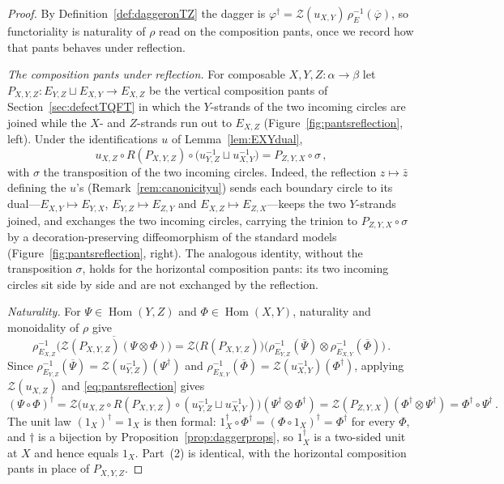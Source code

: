 \documentclass[11pt]{article}
\theoremstyle{definition}
\newcommand{\cZ}{\mathcal{Z}}
\newcommand{\dg}{\dagger}
\begin{document}
\begin{proof}
By Definition~\ref{def:daggeronTZ} the dagger is $\varphi^\dg = \cZ(u_{X,Y})\,\rho_{E}^{-1}(\overline{\varphi})$, so functoriality is naturality of $\rho$ read on the composition pants, once we record how that pants behaves under reflection.

\emph{The composition pants under reflection.} For composable $X, Y, Z \colon \alpha \to \beta$ let $P_{X,Y,Z} \colon E_{Y,Z} \sqcup E_{X,Y} \to E_{X,Z}$ be the vertical composition pants of Section~\ref{sec:defectTQFT} in which the $Y$-strands of the two incoming circles are joined while the $X$- and $Z$-strands run out to $E_{X,Z}$ (Figure~\ref{fig:pantsreflection}, left). Under the identifications $u$ of Lemma~\ref{lem:EXYdual},
\begin{equation}
\label{eq:pantsreflection}
  u_{X,Z} \circ R(P_{X,Y,Z}) \circ \big(u_{Y,Z}^{-1} \sqcup u_{X,Y}^{-1}\big) = P_{Z,Y,X} \circ \sigma \, ,
\end{equation}
with $\sigma$ the transposition of the two incoming circles. Indeed, the reflection $z \mapsto \bar z$ defining the $u$'s (Remark~\ref{rem:canonicityu}) sends each boundary circle to its dual---$E_{X,Y}\mapsto E_{Y,X}$, $E_{Y,Z}\mapsto E_{Z,Y}$ and $E_{X,Z}\mapsto E_{Z,X}$---keeps the two $Y$-strands joined, and exchanges the two incoming circles, carrying the trinion to $P_{Z,Y,X}\circ\sigma$ by a decoration-preserving diffeomorphism of the standard models (Figure~\ref{fig:pantsreflection}, right). The analogous identity, without the transposition $\sigma$, holds for the horizontal composition pants: its two incoming circles sit side by side and are not exchanged by the reflection.

\emph{Naturality.} For $\Psi \in \operatorname{Hom}(Y,Z)$ and $\Phi \in \operatorname{Hom}(X,Y)$, naturality and monoidality of $\rho$ give
\begin{equation}
  \rho_{E_{X,Z}}^{-1}\big(\overline{\cZ(P_{X,Y,Z})(\Psi \otimes \Phi)}\big)
  = \cZ\big(R(P_{X,Y,Z})\big)\big(\rho_{E_{Y,Z}}^{-1}(\overline{\Psi}) \otimes \rho_{E_{X,Y}}^{-1}(\overline{\Phi})\big) \, .
\end{equation}
Since $\rho_{E_{Y,Z}}^{-1}(\overline{\Psi}) = \cZ(u_{Y,Z}^{-1})(\Psi^\dg)$ and $\rho_{E_{X,Y}}^{-1}(\overline{\Phi}) = \cZ(u_{X,Y}^{-1})(\Phi^\dg)$, applying $\cZ(u_{X,Z})$ and \eqref{eq:pantsreflection} gives
\begin{equation}
  (\Psi \circ \Phi)^\dg = \cZ\big(u_{X,Z} \circ R(P_{X,Y,Z}) \circ (u_{Y,Z}^{-1} \sqcup u_{X,Y}^{-1})\big)(\Psi^\dg \otimes \Phi^\dg) = \cZ(P_{Z,Y,X})(\Phi^\dg \otimes \Psi^\dg) = \Phi^\dg \circ \Psi^\dg \, .
\end{equation}
The unit law $(1_X)^\dg = 1_X$ is then formal: $1_X^\dg \circ \Phi^\dg = (\Phi \circ 1_X)^\dg = \Phi^\dg$ for every $\Phi$, and $\dg$ is a bijection by Proposition~\ref{prop:daggerprops}, so $1_X^\dg$ is a two-sided unit at $X$ and hence equals $1_X$. Part~(2) is identical, with the horizontal composition pants in place of $P_{X,Y,Z}$.
\end{proof}
\end{document}
